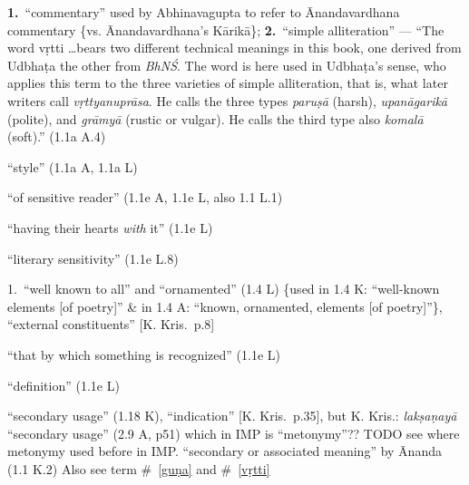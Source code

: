 \documentclass[10pt]{article}
\begin{document}
\begin{multicols}{2}
\begin{enumerate}[
			leftmargin=0em,
			rightmargin=0em,
		]
		 \textbf{1.}\ ``commentary'' used by Abhinavagupta to refer to Ānandavardhana commentary \{vs. Ānanda\-var\-dhana's Kārikā\};
		\textbf{2.}\ ``simple alliteration'' ---
		``The word vṛtti \dots bears two different technical meanings in this book, one derived from Udbhaṭa the other from \textit{BhNŚ}. The word is here used in Udbhaṭa's sense, who applies this term to the three varieties of simple alliteration, that is, what later writers call \textit{vṛttyanuprāsa}. He calls the three types \textit{paruṣā} (harsh), \textit{upanāgarikā} (polite), and \textit{grāmyā} (rustic or vulgar). He calls the third type also \textit{komalā} (soft).'' (1.1a A.4)

		 ``style'' (1.1a A, 1.1a L)

		 ``of sensitive reader'' (1.1e A, 1.1e L, also 1.1 L.1)

		 ``having their hearts \textit{with} it'' (1.1e L)

		 ``literary sensitivity'' (1.1e L.8)


		 1.\ ``well known to all'' and ``ornamented'' (1.4 L) \{used in 1.4 K: ``well-known elements [of poetry]'' \& in 1.4 A: ``known, ornamented, elements [of poetry]''\},
		``external constituents'' [K. Kris.\ p.8]

		 ``that by which something is recognized'' (1.1e L)

		 ``definition'' (1.1e L)

		 ``secondary usage'' (1.18 K), ``indication'' [K. Kris.\ p.35],
		but K. Kris.: \textit{lakṣaṇayā} ``secondary usage'' (2.9 A, p51) which in IMP is ``metonymy''??
		TODO see where metonymy used before in IMP.
		``secondary or associated meaning'' by Ānanda (1.1 K.2)
		Also see term \#~\ref{guṇa} and \#~\ref{vṛtti}



\end{enumerate}
\end{multicols}
\end{document}
